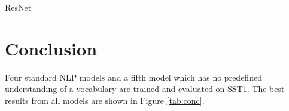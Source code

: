 \documentclass[11pt]{article}
\begin{document}
\begin{subsection}{ResNet}



\end{subsection}






%
%
%
%
%


\section{Conclusion}

Four standard NLP models and a fifth model which has no predefined understanding of a vocabulary are trained and evaluated on SST1. The best results from all models are shown in Figure \ref{tab:conc}.
\end{document}
